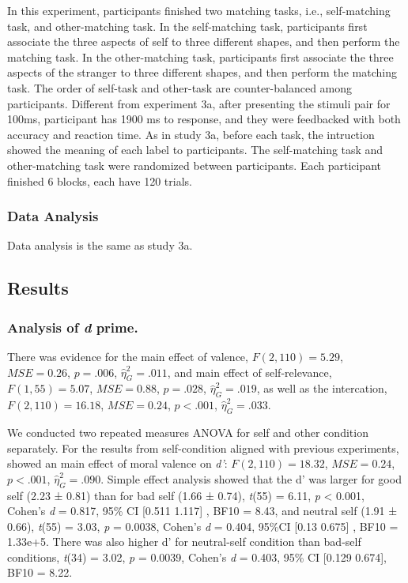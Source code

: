\documentclass[man]{apa6}
\begin{document}
In this experiment, participants finished two matching tasks, i.e., self-matching task, and other-matching task. In the self-matching task, participants first associate the three aspects of self to three different shapes, and then perform the matching task. In the other-matching task, participants first associate the three aspects of the stranger to three different shapes, and then perform the matching task. The order of self-task and other-task are counter-balanced among participants.
Different from experiment 3a, after presenting the stimuli pair for 100ms, participant has 1900 ms to response, and they were feedbacked with both accuracy and reaction time.
As in study 3a, before each task, the intruction showed the meaning of each label to participants. The self-matching task and other-matching task were randomized between participants. Each participant finished 6 blocks, each have 120 trials.

\hypertarget{data-analysis-5}{%
\subsubsection{Data Analysis}\label{data-analysis-5}}

Data analysis is the same as study 3a.

\hypertarget{results-5}{%
\subsection{Results}\label{results-5}}

\hypertarget{analysis-of-d-prime.}{%
\subsubsection{\texorpdfstring{Analysis of \emph{d} prime.}{Analysis of d prime.}}\label{analysis-of-d-prime.}}

There was evidence for the main effect of valence, \(F(2, 110) = 5.29\), \(\mathit{MSE} = 0.26\), \(p = .006\), \(\hat{\eta}^2_G = .011\), and main effect of self-relevance, \(F(1, 55) = 5.07\), \(\mathit{MSE} = 0.88\), \(p = .028\), \(\hat{\eta}^2_G = .019\), as well as the intercation, \(F(2, 110) = 16.18\), \(\mathit{MSE} = 0.24\), \(p < .001\), \(\hat{\eta}^2_G = .033\).

We conducted two repeated measures ANOVA for self and other condition separately. For the results from self-condition aligned with previous experiments, showed an main effect of moral valence on \emph{d'}: \(F(2, 110) = 18.32\), \(\mathit{MSE} = 0.24\), \(p < .001\), \(\hat{\eta}^2_G = .090\). Simple effect analysis showed that the d' was larger for good self (2.23 ± 0.81) than for bad self (1.66 ± 0.74), \emph{t}(55) = 6.11, \emph{p} \textless{} 0.001, Cohen's \emph{d} = 0.817, 95\% CI {[}0.511 1.117{]} , BF10 = 8.43, and neutral self (1.91 ± 0.66), \emph{t}(55) = 3.03, \emph{p} = 0.0038, Cohen's \emph{d} = 0.404, 95\%CI {[}0.13 0.675{]} , BF10 = 1.33e+5. There was also higher d' for neutral-self condition than bad-self conditions, \emph{t}(34) = 3.02, \emph{p} = 0.0039, Cohen's \emph{d} = 0.403, 95\% CI {[}0.129 0.674{]}, BF10 = 8.22.
\end{document}
